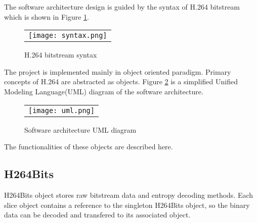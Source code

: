 \documentclass[../main.tex]{subfiles}
\begin{document}
The software architecture design is guided by the syntax of H.264 bitstream which is shown in Figure \ref{fig:syntax}.

\begin{figure} [ht]
\begin{center}
\begin{tabular}{c} %
\texttt{[image: syntax.png]}
\end{tabular}
\end{center}
\caption[syntax] 
{ \label{fig:syntax} H.264 bitstream syntax \cite{richardson2004h}}
\end{figure} 

The project is implemented mainly in object oriented paradigm.
Primary concepts of H.264 are abstracted as objects.
Figure \ref{fig:uml} is a simplified Unified Modeling Language(UML) diagram of the software architecture.

\begin{figure} [ht]
\begin{center}
\begin{tabular}{c} %
\texttt{[image: uml.png]}
\end{tabular}
\end{center}
\caption[uml] 
{ \label{fig:uml} Software architecture UML diagram}
\end{figure} 

The functionalities of these objects are described here.

\subsection{H264Bits}
H264Bits object stores raw bitstream data and entropy decoding methods.
Each slice object contains a reference to the singleton H264Bits object, 
so the binary data can be decoded and transfered to its associated object.

\end{document}

